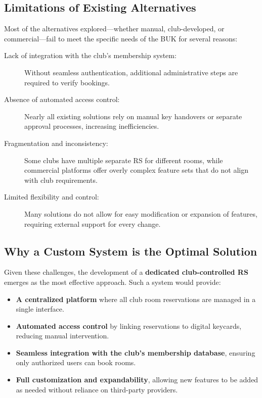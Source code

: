 \subsection{Limitations of Existing Alternatives}

Most of the alternatives explored—whether manual, club-developed, or commercial—fail to meet the specific needs of the BUK for several reasons:

\begin{description}
  \item [Lack of integration with the club’s membership system:] Without seamless authentication, additional administrative steps are required to verify bookings.
  \item [Absence of automated access control:] Nearly all existing solutions rely on manual key handovers or separate approval processes, increasing inefficiencies.
  \item [Fragmentation and inconsistency:] Some clubs have multiple separate RS for different rooms, while commercial platforms offer overly complex feature sets that do not align with club requirements.
  \item [Limited flexibility and control:] Many solutions do not allow for easy modification or expansion of features, requiring external support for every change.
\end{description}

\subsection{Why a Custom System is the Optimal Solution}

Given these challenges, the development of a \textbf{dedicated club-controlled RS} emerges as the most effective approach. Such a system would provide:

\begin{itemize}
  \item \textbf{A centralized platform} where all club room reservations are managed in a single interface.
  \item \textbf{Automated access control } by linking reservations to digital keycards, reducing manual intervention.
  \item \textbf{Seamless integration with the club’s membership database}, ensuring only authorized users can book rooms.
  \item \textbf{Full customization and expandability}, allowing new features to be added as needed without reliance on third-party providers.
\end{itemize}

